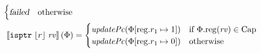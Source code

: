 \documentclass[a4paper]{article}
\newcommand{\update}[2]{[#1 \mapsto #2]}
\newcommand{\sem}[1]{\left\llbracket #1 \right\rrbracket}
\newcommand\lau[1]{{\color{purple} \sf \footnotesize {LS: #1}}\\}
\newcommand\dominique[1]{{\color{purple} \sf \footnotesize {DD: #1}}\\}
\renewcommand\lau[1]{}
\renewcommand\dominique[1]{}
\newcommand{\var}[1]{\mathit{#1}}
\newcommand{\rv}{\var{rv}}
\newcommand{\perm}{\var{perm}}
\newcommand{\plainproj}[1]{\mathrm{#1}}
\newcommand{\memreg}[1][\Phi]{#1.\plainproj{reg}}
\newcommand{\updateReg}[3][\Phi]{#1\update{\plainproj{reg}.#2}{#3}}
\newcommand{\failed}{\textsl{failed}}
\newcommand{\plainfun}[2]{
  \ifthenelse{\equal{#2}{}}
  {\mathit{#1}}
  {\mathit{#1}(#2)}
}
\newcommand{\writeAllowed}[1]{\plainfun{writeAllowed}{#1}}
\newcommand{\stdUpdatePc}[1]{\plainfun{updatePc}{#1}}
\newcommand{\plaindom}[1]{\mathrm{#1}}
\newcommand{\Caps}{\plaindom{Cap}}
\newcommand{\refreg}[1]{\lfloor #1 \rfloor}
\newcommand{\zinstr}[1]{\mathtt{#1}}
\newcommand{\twoinstr}[3]{\zinstr{#1} \; #2 \; #3}
\newcommand{\isptr}[2]{\twoinstr{isptr}{#1}{#2}}
\begin{document}
\begin{align*}
\begin{cases}
                                              \failed & \text{otherwise}
                                            \end{cases}
  \\
  \sem{\isptr{\refreg{r}}{\rv}}(\Phi) & =  
                                  \begin{cases}
                                    \stdUpdatePc{\updateReg{r_1}{1}} & \text{if $\memreg(\rv) \in \Caps$ } \\
                                    \stdUpdatePc{\updateReg{r_1}{0}} & \text{otherwise} 
                                  \end{cases}
\end{align*}
\lau{Our instruction set could use a less than operator.}
\lau{Dominique, apparently there was a reason I had not added the new condition in store to $\writeAllowed{}$. The new condition depends on a case distinction on $w$. It is only if $w$ is a capability that we look into whether it is local or not. But even if $w$ is just an integer, we still need the capability we write through to have some kind of write permission.}
\dominique{I see, but maybe writeAllowed could take $w$ and $c$ as an argument, ratheppppr than just $\perm$? It is now weird that some conditions for writing are in $\writeAllowed{}$, but not all.}

\dominique{factor out reoccurring conditions of the form $n_i = \rv_i$ or $n_i =
  \memreg(\rv_i)$ into a function that evaluates an $\rv$ using a system state?
  This would generalise nicely to the case where we would have additional
  addressing modes.}

\dominique{why doesn't store take an $\rv$?}
\end{document}
